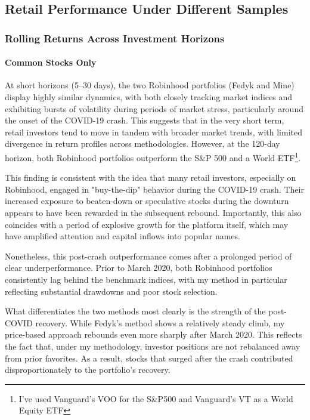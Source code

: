 \subsection{Retail Performance Under Different Samples}\label{diff_samples}




\subsubsection{Rolling Returns Across Investment Horizons}
\paragraph{Common Stocks Only}\label{fedyk_paper_returns}
At short horizons (5–30 days), the two Robinhood portfolios (Fedyk and Mine) display highly similar dynamics, with both closely tracking market indices and exhibiting bursts of volatility during periods of market stress, particularly around the onset of the COVID-19 crash. 
This suggests that in the very short term, retail investors tend to move in tandem with broader market trends, with limited divergence in return profiles across methodologies.
However, at the 120-day horizon, both Robinhood portfolios outperform the S\&P 500 and a World ETF\footnote{I've used Vanguard's VOO for the S\&P500 and Vanguard's VT as a World Equity ETF}. 

This finding is consistent with the idea that many retail investors, especially on Robinhood, engaged in "buy-the-dip" behavior during the COVID-19 crash. 
Their increased exposure to beaten-down or speculative stocks during the downturn appears to have been rewarded in the subsequent rebound. 
Importantly, this also coincides with a period of explosive growth for the platform itself, which may have amplified attention and capital inflows into popular names.

Nonetheless, this post-crash outperformance comes after a prolonged period of clear underperformance. 
Prior to March 2020, both Robinhood portfolios consistently lag behind the benchmark indices, with my method in particular reflecting substantial drawdowns and poor stock selection.

What differentiates the two methods most clearly is the strength of the post-COVID recovery. 
While Fedyk’s method shows a relatively steady climb, my price-based approach rebounds even more sharply after March 2020. 
This reflects the fact that, under my methodology, investor positions are not rebalanced away from prior favorites. 
As a result, stocks that surged after the crash contributed disproportionately to the portfolio’s recovery. 

